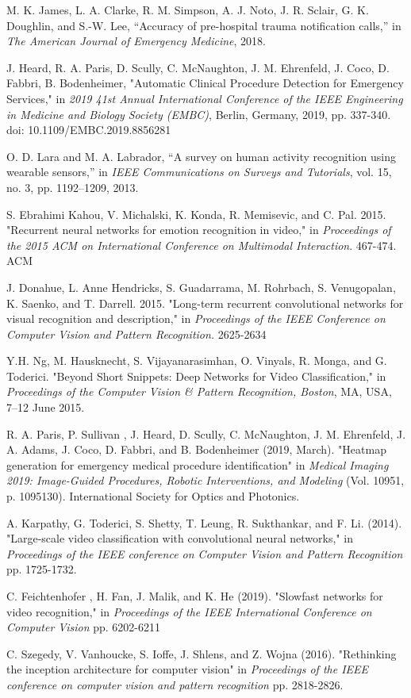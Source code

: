 \documentclass[letterpaper, 10 pt, conference]{ieeeconf}  %
\begin{document}
\begin{thebibliography}{99}

 M. K. James, L. A. Clarke, R. M. Simpson, A. J. Noto, J. R. Sclair, G. K. Doughlin, and S.-W. Lee, “Accuracy of pre-hospital trauma notification calls,” in \textit{The American Journal of Emergency Medicine}, 2018. 

 J. Heard, R. A. Paris, D. Scully, C. McNaughton, J. M. Ehrenfeld, J. Coco, D. Fabbri, B. Bodenheimer, "Automatic Clinical Procedure Detection for Emergency Services,"  in \textit{2019 41st Annual International Conference of the IEEE Engineering in Medicine and Biology Society (EMBC)}, Berlin, Germany, 2019, pp. 337-340. doi: 10.1109/EMBC.2019.8856281

 O. D. Lara and M. A. Labrador, “A survey on human activity recognition using wearable sensors,” in \textit{IEEE Communications on Surveys and Tutorials}, vol. 15, no. 3, pp. 1192–1209, 2013. 

 S. Ebrahimi Kahou, V. Michalski, K. Konda, R. Memisevic, and C. Pal. 2015. "Recurrent neural networks for emotion recognition in video," in \textit{Proceedings of the 2015 ACM on International Conference on Multimodal Interaction}. 467-474. ACM

 J. Donahue, L. Anne Hendricks, S. Guadarrama, M. Rohrbach, S. Venugopalan, K. Saenko, and T. Darrell. 2015. "Long-term recurrent convolutional networks for visual recognition and description," in \textit{Proceedings of the IEEE Conference on Computer Vision and Pattern Recognition.} 2625-2634

 Y.H. Ng, M. Hausknecht, S. Vijayanarasimhan, O. Vinyals, R. Monga, and G. Toderici. "Beyond Short Snippets: Deep Networks for Video Classification," in \textit{Proceedings of the Computer Vision \& Pattern Recognition, Boston}, MA, USA, 7–12 June 2015.

 R. A. Paris, P. Sullivan , J. Heard, D. Scully, C. McNaughton, J. M. Ehrenfeld, J. A. Adams, J. Coco, D. Fabbri, and B. Bodenheimer (2019, March). "Heatmap generation for emergency medical procedure identification" in \textit{Medical Imaging 2019: Image-Guided Procedures, Robotic Interventions, and Modeling} (Vol. 10951, p. 1095130). International Society for Optics and Photonics.

 A. Karpathy, G. Toderici, S. Shetty, T. Leung, R. Sukthankar, and F. Li. (2014). "Large-scale video classification with convolutional neural networks," in \textit{Proceedings of the IEEE conference on Computer Vision and Pattern Recognition} pp. 1725-1732.

 C. Feichtenhofer , H. Fan, J. Malik,  and K. He  (2019). "Slowfast networks for video recognition," in \textit{Proceedings of the IEEE International Conference on Computer Vision} pp. 6202-6211

 C. Szegedy, V. Vanhoucke, S. Ioffe, J. Shlens, and  Z. Wojna (2016). "Rethinking the inception architecture for computer vision" in \textit{Proceedings of the IEEE conference on computer vision and pattern recognition} pp. 2818-2826.



\end{thebibliography}
\end{document}
